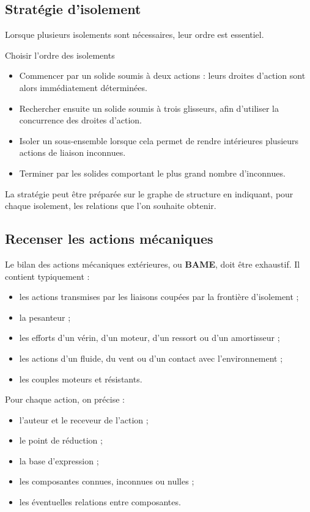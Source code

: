 \subsection{Stratégie d'isolement}

Lorsque plusieurs isolements sont nécessaires, leur ordre est essentiel.

\begin{TLMethod}{Choisir l'ordre des isolements}
\begin{itemize}
  \item Commencer par un solide soumis à deux actions : leurs droites d'action sont alors immédiatement déterminées.
  \item Rechercher ensuite un solide soumis à trois glisseurs, afin d'utiliser la concurrence des droites d'action.
  \item Isoler un sous-ensemble lorsque cela permet de rendre intérieures plusieurs actions de liaison inconnues.
  \item Terminer par les solides comportant le plus grand nombre d'inconnues.
\end{itemize}
\end{TLMethod}

La stratégie peut être préparée sur le graphe de structure en indiquant, pour chaque isolement, les relations que l'on souhaite obtenir.

\subsection{Recenser les actions mécaniques}

Le bilan des actions mécaniques extérieures, ou \textbf{BAME}, doit être exhaustif. Il contient typiquement :
\begin{itemize}
  \item les actions transmises par les liaisons coupées par la frontière d'isolement ;
  \item la pesanteur ;
  \item les efforts d'un vérin, d'un moteur, d'un ressort ou d'un amortisseur ;
  \item les actions d'un fluide, du vent ou d'un contact avec l'environnement ;
  \item les couples moteurs et résistants.
\end{itemize}

\TLBAME

Pour chaque action, on précise :
\begin{itemize}
  \item l'auteur et le receveur de l'action ;
  \item le point de réduction ;
  \item la base d'expression ;
  \item les composantes connues, inconnues ou nulles ;
  \item les éventuelles relations entre composantes.
\end{itemize}

